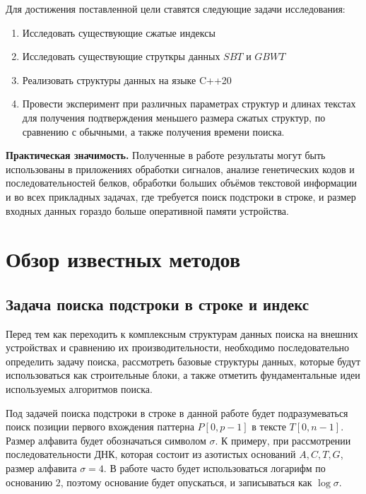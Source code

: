 \documentclass[a4paper,12pt]{article}
\begin{document}
Для достижения поставленной цели ставятся следующие задачи исследования:
\begin{enumerate}
    \item Исследовать существующие сжатые индексы \cite{gonzalez2007compressed}\cite{navarro2007compressed}\cite{mishra2018fast}
    \item Исследовать существующие струткры данных $SBT$ и $GBWT$ \cite{chien2008geometric}\cite{culpepper2010top}\cite{ferragina1999string}\cite{chiu2010efficient}
    \item Реализовать структуры данных на языке C++20 \cite{вандервуд2003шаблоны}
    \item Провести эксперимент при различных параметрах структур и длинах текстах для получения подтверждения меньшего размера сжатых структур, по сравнению с обычными, а также получения времени поиска.
\end{enumerate}

\textbf{Практическая значимость.} Полученные в работе результаты могут быть использованы в приложениях  обработки сигналов, анализе генетических кодов и последовательностей белков, обработки больших объёмов текстовой информации и во всех прикладных задачах, где требуется поиск подстроки в строке, и размер входных данных гораздо больше оперативной памяти устройства.

\newpage

\section{Обзор известных методов}
\subsection{Задача поиска подстроки в строке и индекс}
Перед тем как переходить к комплексным структурам данных поиска на внешних устройствах и сравнению их производительности, необходимо последовательно определить задачу поиска, рассмотреть базовые структуры данных, которые будут использоваться как строительные блоки, а также отметить фундаментальные идеи используемых алгоритмов поиска.

Под задачей поиска подстроки в строке в данной работе будет подразумеваться поиск позиции первого вхождения паттерна $P[0, p-1]$ в тексте $T[0, n-1]$. Размер алфавита будет обозначаться символом $\sigma$. К примеру, при рассмотрении последовательности ДНК, которая состоит из азотистых оснований $A,C,T,G$, размер алфавита $\sigma = 4$. В работе часто будет использоваться логарифм по основанию $2$, поэтому основание будет опускаться, и записываться как $\log\sigma$.
\end{document}
